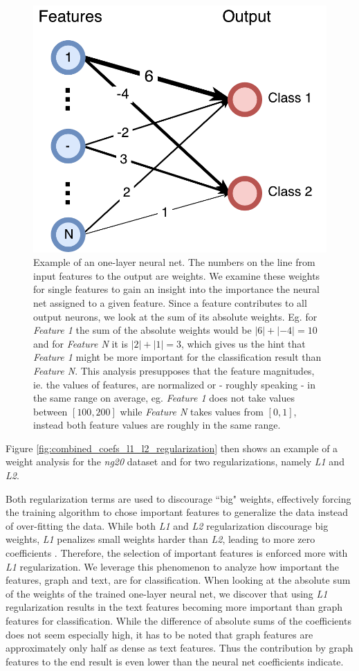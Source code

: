 \begin{figure}[htb!]
    \centering
    {\includegraphics[width=0.5\linewidth]{assets/figures/coefs_example.pdf}%
        \caption[Example: One-layer neural net]{%
            Example of an one-layer neural net. The numbers on the line from input features to the output are weights.
            We examine these weights for single features to gain an insight into the importance the neural net assigned to a given feature. Since a feature contributes to all output neurons, we look at the sum of its absolute weights. Eg. for \textit{Feature 1} the sum of the absolute weights would be $|6| + |-4| = 10$ and for \textit{Feature N} it is $|2| + |1| = 3$, which gives us the hint that \textit{Feature 1} might be more important for the classification result than \textit{Feature N}.
            This analysis presupposes that the feature magnitudes, ie. the values of features, are normalized or - roughly speaking - in the same range on average, eg. \textit{Feature 1} does not take values between $[100, 200]$ while \textit{Feature N} takes values from $[0, 1]$, instead both feature values are roughly in the same range.
        }%
        \label{fig:coefs_example_one_layer}}
\end{figure}

Figure \ref{fig:combined_coefs_l1_l2_regularization} then shows an example of a weight analysis for the \textit{ng20} dataset and for two regularizations, namely \textit{L1} and \textit{L2}.

Both regularization terms are used to discourage ``big" weights, effectively forcing the training algorithm to chose important features to generalize the data instead of over-fitting the data.
While both \textit{L1} and \textit{L2} regularization discourage big weights, \textit{L1} penalizes small weights harder than \textit{L2}, leading to more zero coefficients \cite[p.~13]{Hastie2009}.
Therefore, the selection of important features is enforced more with \textit{L1} regularization.
We leverage this phenomenon to analyze how important the features, graph and text, are for classification.
When looking at the absolute sum of the weights of the trained one-layer neural net, we discover that using \textit{L1} regularization results in the text features becoming more important than graph features for classification.
While the difference of absolute sums of the coefficients does not seem especially high, it has to be noted that graph features are approximately only half as dense as text features.
Thus the contribution by graph features to the end result is even lower than the neural net coefficients indicate.

